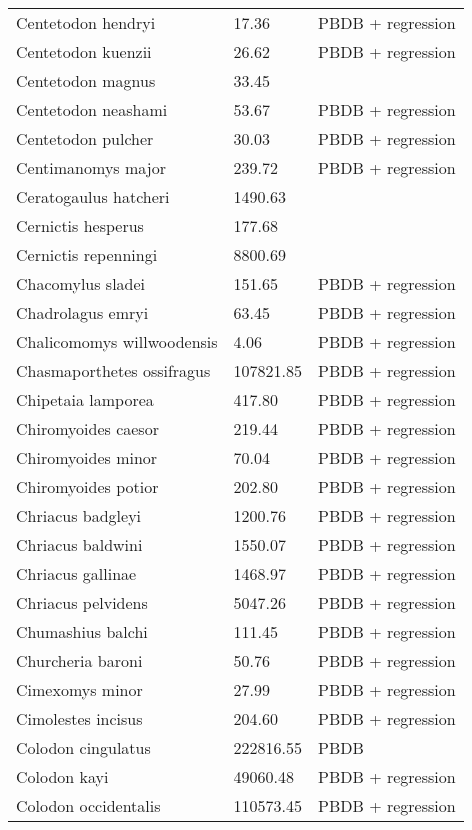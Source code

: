 \documentclass{article}
\begin{document}
\begin{center}
\begin{longtable}{p{} p{} p{}}
    Centetodon hendryi & 17.36 & PBDB + regression \\ 
    Centetodon kuenzii & 26.62 & PBDB + regression \\ 
    Centetodon magnus & 33.45 & \cite{Tomiya2013} \\ 
    Centetodon neashami & 53.67 & PBDB + regression \\ 
    Centetodon pulcher & 30.03 & PBDB + regression \\ 
    Centimanomys major & 239.72 & PBDB + regression \\ 
    Ceratogaulus hatcheri & 1490.63 & \cite{Cassiliano2008} \\ 
    Cernictis hesperus & 177.68 & \cite{Tomiya2013} \\ 
    Cernictis repenningi & 8800.69 & \cite{Hall1930} \\ 
    Chacomylus sladei & 151.65 & PBDB + regression \\ 
    Chadrolagus emryi & 63.45 & PBDB + regression \\ 
    Chalicomomys willwoodensis & 4.06 & PBDB + regression \\ 
    Chasmaporthetes ossifragus & 107821.85 & PBDB + regression \\ 
    Chipetaia lamporea & 417.80 & PBDB + regression \\ 
    Chiromyoides caesor & 219.44 & PBDB + regression \\ 
    Chiromyoides minor & 70.04 & PBDB + regression \\ 
    Chiromyoides potior & 202.80 & PBDB + regression \\ 
    Chriacus badgleyi & 1200.76 & PBDB + regression \\ 
    Chriacus baldwini & 1550.07 & PBDB + regression \\ 
    Chriacus gallinae & 1468.97 & PBDB + regression \\ 
    Chriacus pelvidens & 5047.26 & PBDB + regression \\ 
    Chumashius balchi & 111.45 & PBDB + regression \\ 
    Churcheria baroni & 50.76 & PBDB + regression \\ 
    Cimexomys minor & 27.99 & PBDB + regression \\ 
    Cimolestes incisus & 204.60 & PBDB + regression \\ 
    Colodon cingulatus & 222816.55 & PBDB \\ 
    Colodon kayi & 49060.48 & PBDB + regression \\ 
    Colodon occidentalis & 110573.45 & PBDB + regression \\ 

\end{longtable}
\end{center}
\end{document}
